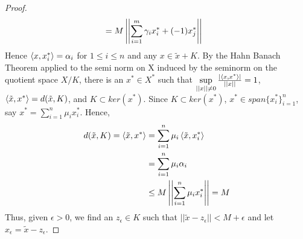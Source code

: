 \begin{thm}
\begin{proof}
\begin{align}
            & =M\left|\left| \sum_{i=1}^m \gamma_i x_i^* + (-1) x_j^* \right|\right|
        \end{align}
        Hence $\left\langle x,x_i^* \right\rangle = \alpha_i$ for $1 \leq i \leq n$ and any $x \in \tilde{x}+K$. 
        By the Hahn Banach Theorem applied to the semi norm on X induced by the seminorm on the quotient space $X/K$, there is an $x^* \in X^*$ such that $\sup\limits_{\left|\left| x \right|\right| \neq 0} \frac{\left| \left\langle x,x^* \right\rangle \right|}{\left|\left| x \right|\right|} =1$, $\left\langle \tilde{x},x^* \right\rangle = d(\tilde{x},K)$, and $K \subset ker(x^*)$. Since $K \subset ker(x^*)$, $x^* \in span \{ x_i^*\}_{i=1}^n$, say $x^* = \sum_{i=1}^n \mu_i x_i^*$. 
        Hence, 
        \begin{equation}
            \begin{split}
                d(\tilde{x},K) = \left\langle \tilde{x},x^* \right\rangle & = \sum_{i=1}^n \mu_i \left\langle \tilde{x},x_i^* \right\rangle\\
                & = \sum_{i=1}^n \mu_i \alpha_i\\
                & \leq M\left|\left| \sum_{i=1}^n \mu_i x_i^* \right|\right|=M 
            \end{split}
        \end{equation}
        Thus, given $\epsilon > 0$, we find an $z_\epsilon \in K$ such that $||\tilde{x}-z_\epsilon|| < M+\epsilon$ and let $x_\epsilon=\tilde{x}-z_\epsilon$. 
        
    \end{proof}
    
\end{thm}


